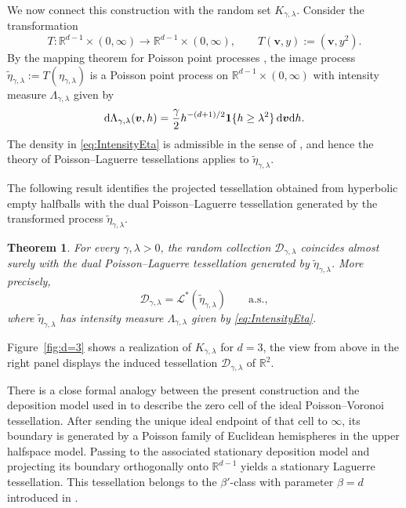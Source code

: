 \documentclass[11pt,a4paper]{article}
\theoremstyle{plain}
\newtheorem{theorem}{Theorem}
\theoremstyle{definition}
\theoremstyle{remark}
\newcommand{\dint}{\textup{d}}
\newcommand{\bv}{\boldsymbol{v}}
\def\RR{\mathbb{R}}
\def\cD{\mathcal{D}}
\begin{document}
We now connect this construction with the random set
$K_{\gamma,\lambda}$. Consider the transformation
\[
	T:\RR^{d-1}\times(0,\infty)\to\RR^{d-1}\times(0,\infty),
	\qquad
	T(\bv,y):=(\bv,y^2).
\]
By the mapping theorem for Poisson point processes
\cite[Theorem~5.1]{LPbook}, the image process $\widetilde\eta_{\gamma,\lambda}:=T(\eta_{\gamma,\lambda})$
is a Poisson point process on $\RR^{d-1}\times(0,\infty)$ with intensity
measure $\Lambda_{\gamma,\lambda}$ given by
\begin{equation}\label{eq:IntensityEta}
	\dint\Lambda_{\gamma,\lambda}(\bv,h)
	=
	\frac{\gamma}{2}h^{-(d+1)/2}
	\mathbf 1\{h\ge \lambda^2\}\,
	\dint\bv\dint h .
\end{equation}
The density in \eqref{eq:IntensityEta} is admissible in the sense of
\cite[Definition~3.4]{GiWL}, and hence the theory of
Poisson--Laguerre tessellations applies to $\widetilde\eta_{\gamma,\lambda}$.

The following result identifies the projected tessellation obtained from
hyperbolic empty halfballs with the dual Poisson--Laguerre tessellation
generated by the transformed process $\widetilde\eta_{\gamma,\lambda}$.

\begin{theorem}\label{thm:DlambdaIsTessellation}
	For every $\gamma,\lambda>0$, the random collection
	$\mathcal D_{\gamma,\lambda}$ coincides almost surely with the dual
	Poisson--Laguerre tessellation generated by
	$\widetilde\eta_{\gamma,\lambda}$. More precisely,
	\[
		\mathcal D_{\gamma,\lambda}
		=
		\mathcal L^*(\widetilde\eta_{\gamma,\lambda})
		\qquad \text{a.s.},
	\]
	where $\widetilde\eta_{\gamma,\lambda}$ has intensity measure
	$\Lambda_{\gamma,\lambda}$ given by \eqref{eq:IntensityEta}.
\end{theorem}

Figure~\ref{fig:d=3} shows a realization of $K_{\gamma,\lambda}$ for $d=3$, the view
from above in the right panel displays the induced tessellation
$\cD_{\gamma,\lambda}$ of $\RR^{2}$.

There is a close formal analogy between the present construction and the
deposition model used in \cite[Sections~5.1 and~5.3.2]{DCE+26} to describe
the zero cell of the ideal Poisson--Voronoi tessellation. After sending the
unique ideal endpoint of that cell to $\infty$, its boundary is generated
by a Poisson family of Euclidean hemispheres in the upper halfspace model.
Passing to the associated stationary deposition model and projecting its
boundary orthogonally onto $\RR^{d-1}$ yields a stationary Laguerre
tessellation. This tessellation belongs to the $\beta'$-class with parameter $\beta=d$ introduced in \cite{GKT22}.
\end{document}

